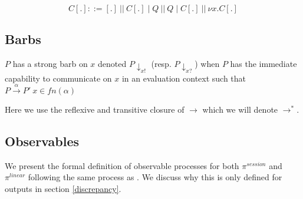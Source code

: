 \begin{equation*}
    C[.] ::= [.] \: || \: C[.] \; |\; Q \:||\: Q \; | \; C[.] \: || \: \nu x.C[.]
\end{equation*}

\subsection{Barbs}

\begin{definition}
    $P$ has a strong barb on $x$ denoted $P \downarrow_{x!}$ (resp. $P \downarrow_{x?}$) when $P$ has the immediate capability to communicate on $x$ in an evaluation context such that $P \xrightarrow{\alpha} P' \: x \in fn(\alpha)$
    \label{def:StrongBarb}
\end{definition}



Here we use the reflexive and transitive closure of $\rightarrow$ which we will denote $\rightarrow^*$.

\subsection{Observables} 
We present the formal definition of observable processes for both $\pi^{session}$ and $\pi^{linear}$ following the same process as \citep{demangeon2011full}. We discuss why this is only defined for outputs in section \autoref{discrepancy}.

